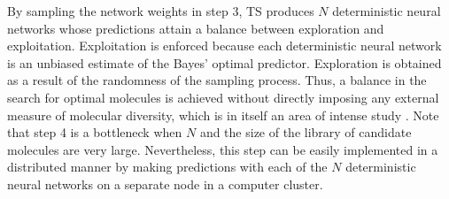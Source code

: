 By sampling the network weights in step 3, TS produces $N$ deterministic neural networks whose predictions attain a balance between exploration and exploitation. Exploitation is enforced because each deterministic neural network is an unbiased estimate of the Bayes' optimal predictor. Exploration is obtained as a result of the randomness of the sampling process. 
Thus, a balance in the search for optimal molecules is achieved without directly imposing any external measure of molecular diversity, which is in itself an area of intense study \cite{Maldonado_2006}. 
Note that step 4 is a bottleneck when $N$ and the size of the library of candidate molecules are very large.
Nevertheless, this step can be easily implemented in a distributed manner by making predictions with each of
the $N$ deterministic neural networks on a separate node in a computer cluster.